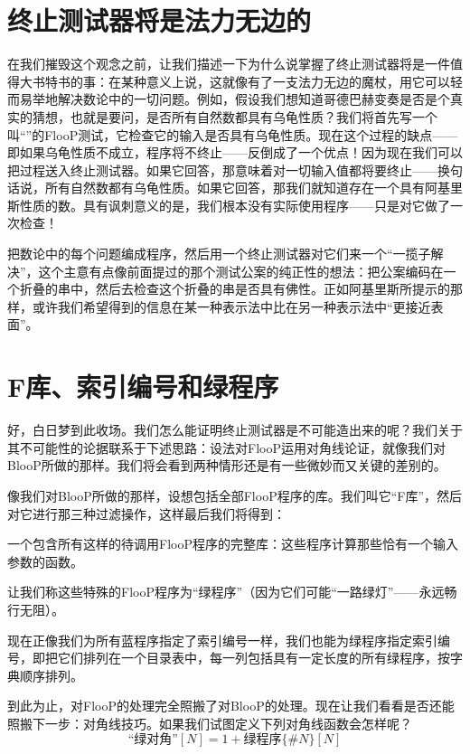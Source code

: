 \section{终止测试器将是法力无边的}

在我们摧毁这个观念之前，让我们描述一下为什么说掌握了终止测试器将是一件值得大书特书的事：在某种意义上说，这就像有了一支法力无边的魔杖，用它可以轻而易举地解决数论中的一切问题。例如，假设我们想知道哥德巴赫变奏是否是个真实的猜想，也就是要问，是否所有自然数都具有乌龟性质？我们将首先写一个叫“”的FlooP测试，它检查它的输入是否具有乌龟性质。现在这个过程的缺点——即如果乌龟性质不成立，程序将不终止——反倒成了一个优点！因为现在我们可以把过程送入终止测试器。如果它回答，那意味着对一切输入值都将要终止——换句话说，所有自然数都有乌龟性质。如果它回答，那我们就知道存在一个具有阿基里斯性质的数。具有讽刺意义的是，我们根本没有实际使用程序——只是对它做了一次检查！

把数论中的每个问题编成程序，然后用一个终止测试器对它们来一个“一揽子解决”，这个主意有点像前面提过的那个测试公案的纯正性的想法：把公案编码在一个折叠的串中，然后去检查这个折叠的串是否具有佛性。正如阿基里斯所提示的那样，或许我们希望得到的信息在某一种表示法中比在另一种表示法中“更接近表面”。

\section{F库、索引编号和绿程序}

好，白日梦到此收场。我们怎么能证明终止测试器是不可能造出来的呢？我们关于其不可能性的论据联系于下述思路：设法对FlooP运用对角线论证，就像我们对BlooP所做的那样。我们将会看到两种情形还是有一些微妙而又关键的差别的。

像我们对BlooP所做的那样，设想包括全部FlooP程序的库。我们叫它“F库”，然后对它进行那三种过滤操作，这样最后我们将得到：

\begin{block}
一个包含所有这样的待调用FlooP程序的完整库：这些程序计算那些恰有一个输入参数的函数。
\end{block}

让我们称这些特殊的FlooP程序为“绿程序”（因为它们可能“一路绿灯”——永远畅行无阻）。

现在正像我们为所有蓝程序指定了索引编号一样，我们也能为绿程序指定索引编号，即把它们排列在一个目录表中，每一列包括具有一定长度的所有绿程序，按字典顺序排列。

到此为止，对FlooP的处理完全照搬了对BlooP的处理。现在让我们看看是否还能照搬下一步：对角线技巧。如果我们试图定义下列对角线函数会怎样呢？
\[
\text{“绿对角”}[N]=1+\text{绿程序}\{\#N\}[N]
\]

